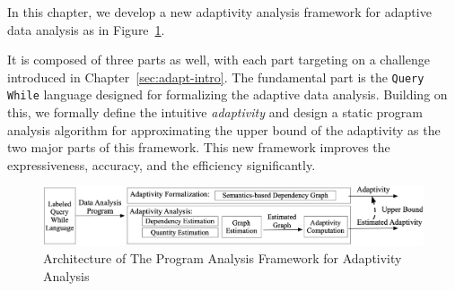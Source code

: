 
In this chapter, we develop a new adaptivity analysis framework for
adaptive data analysis as in Figure~\ref{fig:structure}.

It is composed of three parts as well, with each part targeting on a challenge introduced in Chapter~\ref{sec:adapt-intro}.
The fundamental part is the {\tt Query While} language designed for formalizing the 
adaptive data analysis. Building on this, 
we formally define the intuitive \emph{adaptivity} 
and design a static program analysis algorithm for approximating the upper bound of the 
adaptivity as the two major parts of this framework.
This new framework improves the expressiveness, accuracy, and the efficiency significantly.
\begin{figure}
   \centering   
   \includegraphics[width=1.0\textwidth]{figures/architecture.png}
  \caption{Architecture of The Program Analysis Framework for Adaptivity Analysis}
   \label{fig:structure}
\end{figure}